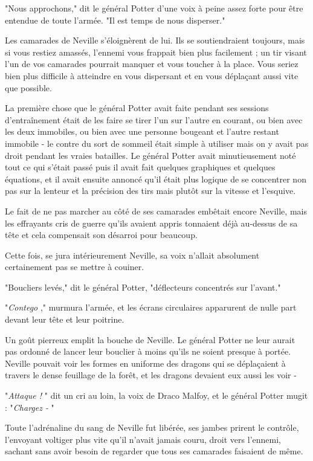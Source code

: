 "Nous approchons," dit le général Potter d'une voix à peine assez forte pour être entendue de toute l'armée. "Il est temps de nous disperser."

Les camarades de Neville s'éloignèrent de lui. Ils se soutiendraient toujours, mais si vous restiez amassés, l'ennemi vous frappait bien plus facilement ; un tir visant l'un de vos camarades pourrait manquer et vous toucher à la place. Vous seriez bien plus difficile à atteindre en vous dispersant et en vous déplaçant aussi vite que possible.

La première chose que le général Potter avait faite pendant ses sessions d'entraînement était de les faire se tirer l'un sur l'autre en courant, ou bien avec les deux immobiles, ou bien avec une personne bougeant et l'autre restant immobile - le contre du sort de sommeil était simple à utiliser mais on y avait pas droit pendant les vraies batailles. Le général Potter avait minutieusement noté tout ce qui s'était passé puis il avait fait quelques graphiques et quelques équations, et il avait ensuite annoncé qu'il était plus logique de se concentrer non pas sur la lenteur et la précision des tirs mais plutôt sur la vitesse et l'esquive.

Le fait de ne pas marcher au côté de ses camarades embêtait encore Neville, mais les effrayants cris de guerre qu'ils avaient appris tonnaient déjà au-dessus de sa tête et cela compensait son désarroi pour beaucoup.

Cette fois, se jura intérieurement Neville, sa voix n'allait absolument certainement pas se mettre à couiner.

"Boucliers levés," dit le général Potter, "déflecteurs concentrés sur l'avant."

"\emph{Contego} ," murmura l'armée, et les écrans circulaires apparurent de nulle part devant leur tête et leur poitrine.

Un goût pierreux emplit la bouche de Neville. Le général Potter ne leur aurait pas ordonné de lancer leur bouclier à moins qu'ils ne soient presque à portée. Neville pouvait voir les formes en uniforme des dragons qui se déplaçaient à travers le dense feuillage de la forêt, et les dragons devaient eux aussi les voir -

"\emph{Attaque !} " dit un cri au loin, la voix de Draco Malfoy, et le général Potter mugit : "\emph{Chargez -} "

Toute l'adrénaline du sang de Neville fut libérée, ses jambes prirent le contrôle, l'envoyant voltiger plus vite qu'il n'avait jamais couru, droit vers l'ennemi, sachant sans avoir besoin de regarder que tous ses camarades faisaient de même.

